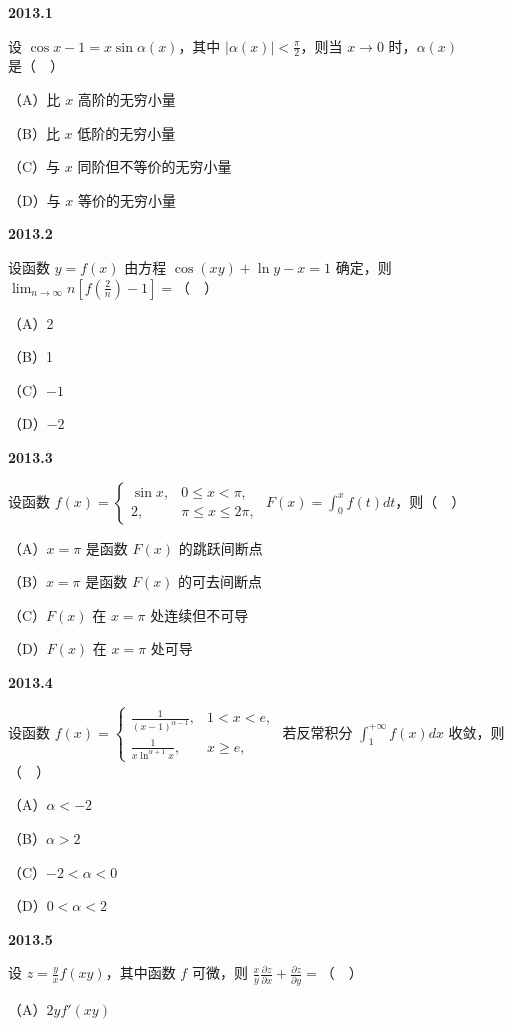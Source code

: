 \documentclass[UTF8,12pt,fontset=windows]{ctexart}
\begin{document}
{\large\bfseries 2013.1}

设 $\cos x - 1 = x\sin\alpha(x)$，其中 $|\alpha(x)| < \frac{\pi}{2}$，则当 $x \to 0$ 时，$\alpha(x)$ 是（　）

（A）比 $x$ 高阶的无穷小量

（B）比 $x$ 低阶的无穷小量

（C）与 $x$ 同阶但不等价的无穷小量

（D）与 $x$ 等价的无穷小量

\vfill
\newpage
{\large\bfseries 2013.2}

设函数 $y = f(x)$ 由方程 $\cos(xy) + \ln y - x = 1$ 确定，则 $\lim_{n \to \infty}n\left[f\left(\frac{2}{n}\right) - 1\right] =$（　）

（A）2

（B）1

（C）$-1$

（D）$-2$

\vfill
\newpage
{\large\bfseries 2013.3}

设函数 $f(x) = \begin{cases} \sin x, & 0 \le x < \pi, \\ 2, & \pi \le x \le 2\pi, \end{cases}$ $F(x) = \int_0^x f(t)dt$，则（　）

（A）$x = \pi$ 是函数 $F(x)$ 的跳跃间断点

（B）$x = \pi$ 是函数 $F(x)$ 的可去间断点

（C）$F(x)$ 在 $x = \pi$ 处连续但不可导

（D）$F(x)$ 在 $x = \pi$ 处可导

\vfill
\newpage
{\large\bfseries 2013.4}

设函数 $f(x) = \begin{cases} \frac{1}{(x-1)^{\alpha-1}}, & 1 < x < e, \\ \frac{1}{x\ln^{\alpha+1}x}, & x \ge e, \end{cases}$ 若反常积分 $\int_1^{+\infty}f(x)dx$ 收敛，则（　）

（A）$\alpha < -2$

（B）$\alpha > 2$

（C）$-2 < \alpha < 0$

（D）$0 < \alpha < 2$

\vfill
\newpage
{\large\bfseries 2013.5}

设 $z = \frac{y}{x}f(xy)$，其中函数 $f$ 可微，则 $\frac{x}{y}\frac{\partial z}{\partial x} + \frac{\partial z}{\partial y} =$（　）

（A）$2yf'(xy)$
\end{document}
